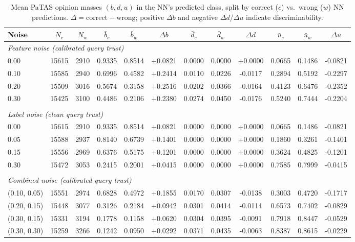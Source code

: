 \begin{table}[ht]
\centering
\caption{Mean PaTAS opinion masses $(b, d, u)$ in the NN's predicted class, split by correct ($c$) vs.\ wrong ($w$) NN predictions. $\Delta = \text{correct} - \text{wrong}$; positive $\Delta b$ and negative $\Delta d$/$\Delta u$ indicate discriminability.}
\label{tab:patas-effectiveness}
\begin{tabular}{lccccccccccc}
\toprule
Noise & $N_c$ & $N_w$ & $\bar{b}_c$ & $\bar{b}_w$ & $\Delta b$ & $\bar{d}_c$ & $\bar{d}_w$ & $\Delta d$ & $\bar{u}_c$ & $\bar{u}_w$ & $\Delta u$ \\
\midrule
\multicolumn{12}{l}{\textit{Feature noise (calibrated query trust)}} \\
0.00 & 15615 & 2910 & 0.9335 & 0.8514 & +0.0821 & 0.0000 & 0.0000 & +0.0000 & 0.0665 & 0.1486 & -0.0821 \\
0.10 & 15585 & 2940 & 0.6996 & 0.4582 & +0.2414 & 0.0110 & 0.0226 & -0.0117 & 0.2894 & 0.5192 & -0.2297 \\
0.20 & 15509 & 3016 & 0.5674 & 0.3158 & +0.2516 & 0.0202 & 0.0366 & -0.0164 & 0.4123 & 0.6476 & -0.2352 \\
0.30 & 15425 & 3100 & 0.4486 & 0.2106 & +0.2380 & 0.0274 & 0.0450 & -0.0176 & 0.5240 & 0.7444 & -0.2204 \\
\midrule \\
\multicolumn{12}{l}{\textit{Label noise (clean query trust)}} \\
0.00 & 15615 & 2910 & 0.9335 & 0.8514 & +0.0821 & 0.0000 & 0.0000 & +0.0000 & 0.0665 & 0.1486 & -0.0821 \\
0.05 & 15588 & 2937 & 0.8140 & 0.6739 & +0.1401 & 0.0000 & 0.0000 & +0.0000 & 0.1860 & 0.3261 & -0.1401 \\
0.15 & 15556 & 2969 & 0.6376 & 0.5175 & +0.1201 & 0.0000 & 0.0000 & +0.0000 & 0.3624 & 0.4825 & -0.1201 \\
0.30 & 15472 & 3053 & 0.2415 & 0.2001 & +0.0415 & 0.0000 & 0.0000 & +0.0000 & 0.7585 & 0.7999 & -0.0415 \\
\midrule \\
\multicolumn{12}{l}{\textit{Combined noise (calibrated query trust)}} \\
(0.10, 0.05) & 15551 & 2974 & 0.6828 & 0.4972 & +0.1855 & 0.0170 & 0.0307 & -0.0138 & 0.3003 & 0.4720 & -0.1717 \\
(0.20, 0.15) & 15448 & 3077 & 0.3126 & 0.2184 & +0.0942 & 0.0301 & 0.0414 & -0.0114 & 0.6573 & 0.7402 & -0.0829 \\
(0.30, 0.15) & 15331 & 3194 & 0.1778 & 0.1158 & +0.0620 & 0.0304 & 0.0395 & -0.0091 & 0.7918 & 0.8447 & -0.0529 \\
(0.30, 0.30) & 15259 & 3266 & 0.1242 & 0.0950 & +0.0292 & 0.0371 & 0.0435 & -0.0063 & 0.8387 & 0.8615 & -0.0229 \\
\bottomrule
\end{tabular}
\end{table}